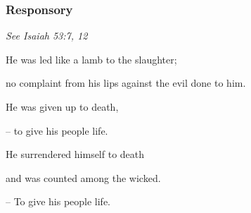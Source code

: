 \subsubsection{Responsory}
\hfill \emph{See Isaiah 53:7, 12}

He was led like a lamb to the slaughter;\par
no complaint from his lips against the evil done to him.\par
He was given up to death,\par
– to give his people life.\par
\vspace{5pt}
He surrendered himself to death\par
and was counted among the wicked.\par
– To give his people life.
